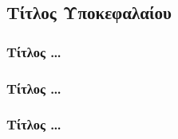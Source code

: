 \subsection{Τίτλος Υποκεφαλαίου}

\bigskip

\begin{indented}
\end{indented}

\subsubsection{Τίτλος \ldots}

\bigskip

\subsubsection{Τίτλος \ldots}

\bigskip

\subsubsection{Τίτλος \ldots}

\bigskip
